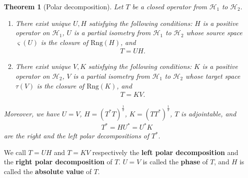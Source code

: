 \documentclass[12pt,b5paper,notitlepage]{article}
\theoremstyle{definition}
\theoremstyle{plain}
\newtheorem{thm}[df]{Theorem}
\newcommand{\mc}{\mathcal}
\newcommand{\sgm}{\varsigma}
\newcommand{\Rng}{\mathrm{Rng}}
\numberwithin{equation}{section}
\begin{document}
\begin{thm}[Polar decomposition]\label{lb22}
Let $T$ be a closed operator from $\mc H_1$ to $\mc H_2$. 
\begin{enumerate}
\item There exist unique $U,H$ satisfying the following conditions:   $H$ is a positive operator on $\mc H_1$, $U$ is a partial isometry from $\mc H_1$ to $\mc H_2$ whose source space $\sgm(U)$ is the closure of $\Rng(H)$, and
\begin{align*}
	T=UH.
\end{align*} 
\item There exist unique $V,K$ satisfying the following conditions:   $K$ is a positive operator on $\mc H_2$, $V$ is a partial isometry from $\mc H_1$ to $\mc H_2$ whose target space $\tau(V)$ is the closure of $\Rng(K)$, and
\begin{align*}
	T=KV.
\end{align*} 
\end{enumerate}
Moreover, we have $U=V$, $H=(T^*T)^{\frac 12}$,  $K=(TT^*)^{\frac 12}$, $T$ is adjointable, and
\begin{align*}
T^*=HU^*=U^*K	
\end{align*}
are the right and the left  polar decompositions of $T^*$.
\end{thm}

We call $T=UH$ and $T=KV$ respectively the \textbf{left polar decomposition} and the \textbf{right polar decomposition} of $T$. $U=V$ is called the \textbf{phase} of $T$, and $H$ is called the \textbf{absolute value} of $T$. 
\end{document}
